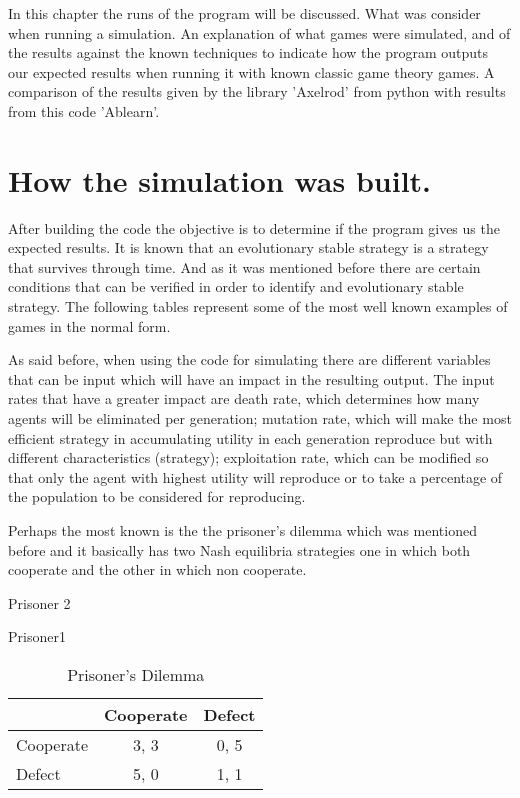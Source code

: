 \label{ch:codeapp}
In this chapter the runs of the program will be discussed. What was consider when running a simulation. An explanation of what games were simulated, and of the results against the known techniques to indicate how the program outputs our expected results when running it with known classic game theory games. A comparison of the results given by the  library 'Axelrod' from python with results from this code 'Ablearn'.

\section{How the simulation was built.}
After building the code the objective is to determine if the program gives us the expected results. It is  known that an evolutionary stable strategy is a strategy that survives through time. And as it was mentioned before there are certain conditions that can  be verified in order to identify and evolutionary stable strategy. The following tables represent some of the most well known examples of games in the normal form. 

As said before, when using the code for simulating there are different variables that can be input which will have an impact in the resulting output. The input rates that have a greater impact are death rate, which determines how many agents will be eliminated per generation; mutation rate, which will make the most efficient strategy in accumulating utility in each generation reproduce but with different characteristics (strategy); exploitation rate, which can be modified so that only the agent with highest utility will reproduce or to take a percentage of the population to be considered for reproducing.

Perhaps the most known is the the prisoner's dilemma which was mentioned before and it basically has two Nash equilibria strategies one in which both cooperate and the other in which non cooperate.

\begin{table}[h]
\begin{center}
Prisoner 2

Prisoner1
\begin{tabular}{|l|c|c|}
\hline
 & Cooperate & Defect \\ 
\hline
Cooperate & 3, 3 & 0, 5\\
\hline
 Defect & 5, 0 & 1, 1\\
\hline
\end{tabular}
\caption{Prisoner's Dilemma}
\label{tab:prisdiltag}
\end{center}
\end{table}


